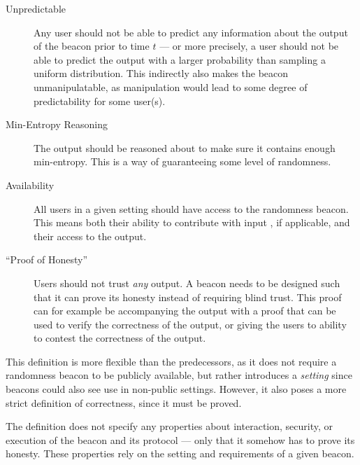 \begin{description}
    \item[Unpredictable]
        Any user should not be able to predict any information about the output of the beacon prior to time $t$ --- or more precisely, a user should not be able to predict the output with a larger probability than sampling a uniform distribution.
        This indirectly also makes the beacon unmanipulatable, as manipulation would lead to some degree of predictability for some user(s).
    \item[Min-Entropy Reasoning]
        The output should be reasoned about  to make sure it contains enough min-entropy.
        This is a way of guaranteeing some level of randomness.
    \item[Availability]
        All users in a given setting should have access to the randomness beacon.
        This means both their ability to contribute with input , if applicable, and their access to the output.
    \item[\enquote{Proof of Honesty}]
        Users should not trust  \emph{any} output.
        A beacon needs to be designed such that it can prove its honesty instead of requiring blind trust.
        This proof can for example be accompanying the output with a proof that can be used to verify the correctness of the output, or giving the users to ability to contest the correctness of the output.
\end{description}

This definition is more flexible than the predecessors, as it does not require a randomness beacon to be publicly available, but rather introduces a \emph{setting} since beacons could also see use in non-public settings.
However, it also poses a more strict definition of correctness, since it must be proved.

The definition does not specify any properties about interaction, security, or execution of the beacon and its protocol --- only that it somehow has to prove its honesty.
These properties rely on the setting and requirements of a given beacon.
